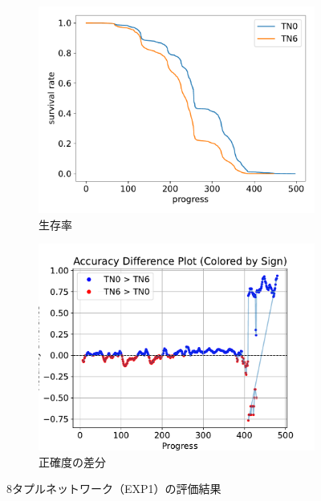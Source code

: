 \begin{figure}[t]
\begin{subfigure}[b]{0.49\linewidth}
    \includegraphics[width=\linewidth]{pdf/compare/merged_NT8_OI1200_compare/survival.pdf}
    \caption{生存率}
    \label{fig:nt8_exp1_survival}
\end{subfigure}
\begin{subfigure}[b]{0.49\linewidth}
    \includegraphics[width=\linewidth]{pdf/compare/merged_NT8_OI1200_compare/acc_diff_plot.pdf}
    \caption{正確度の差分}
    \label{fig:nt8_exp1_acc_diff}
\end{subfigure}
\caption{8タプルネットワーク（EXP1）の評価結果}
\label{fig:nt8_exp1_results}
\end{figure}
    

